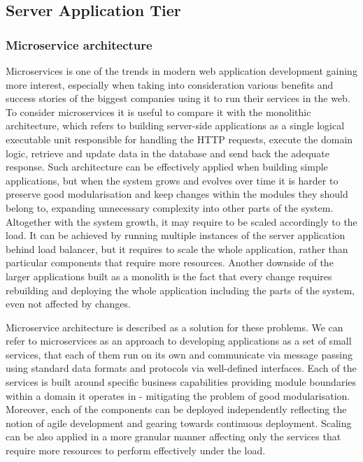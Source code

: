 \subsection{Server Application Tier}


\subsubsection*{Microservice architecture}


Microservices is one of the trends in modern web application development gaining more interest, especially when taking into consideration various benefits and success stories of the biggest companies using it to run their services in the web. To consider microservices it is useful to compare it with the monolithic architecture, which refers to building server-side applications as a single logical executable unit responsible for handling the HTTP requests, execute the domain logic, retrieve and update data in the database and send back the adequate response. Such architecture can be effectively applied when building simple applications, but when the system grows and evolves over time it is harder to preserve good modularisation and keep changes within the modules they should belong to, expanding unnecessary complexity into other parts of the system. Altogether with the system growth, it may require to be scaled accordingly to the load. It can be achieved by running multiple instances of the server application behind load balancer, but it requires to scale the whole application, rather than particular components that require more resources. Another downside of the larger applications built as a monolith is the fact that every change requires rebuilding and deploying the whole application including the parts of the system, even not affected by changes.

Microservice architecture is described as a solution for these problems. We can refer to microservices as an approach to developing applications as a set of small services, that each of them run on its own and communicate via message passing using standard data formats and protocols via well-defined interfaces. Each of the services is built around specific business capabilities providing module boundaries within a domain it operates in - mitigating the problem of good modularisation. Moreover, each of the components can be deployed independently reflecting the notion of agile development and gearing towards continuous deployment. Scaling can be also applied in a more granular manner affecting only the services that require more resources to perform effectively under the load. \cite{FowlerMicroservices}

